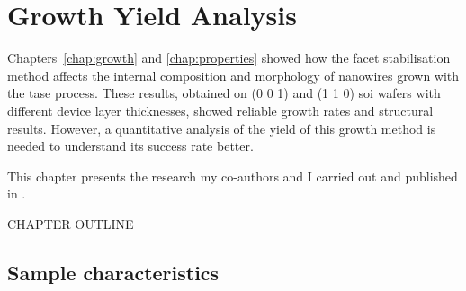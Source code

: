 \chapter{Growth Yield Analysis}
\label{chap:yield_analysis}

Chapters~\ref{chap:growth} and \ref{chap:properties} showed how the  facet stabilisation method affects the internal composition and morphology of nanowires grown with the \acf{tase} process. These results, obtained on \hkl(0 0 1) and \hkl(1 1 0) \acf{soi} wafers with different device layer thicknesses, showed reliable growth rates and structural results. However, a quantitative analysis of the yield of this growth method is needed to understand its success rate better. 

This chapter presents the research my co-authors and I carried out and published in \cite{Brugnolotto2023_2, Brugnolotto2024}.

CHAPTER OUTLINE

\section{Sample characteristics}

